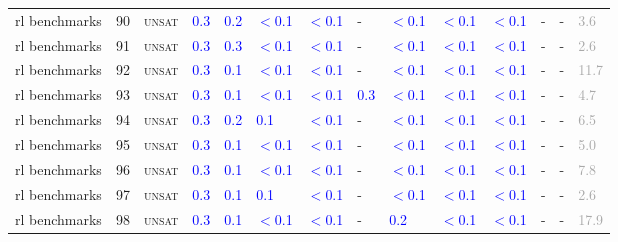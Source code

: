 \begin{center}
{\begin{longtable}{@{}llllllllllllll@{}}
rl benchmarks & 90 & \textsc{unsat} & \textcolor{blue}{0.3} & \textcolor{blue}{0.2} & \textcolor{blue}{$<$0.1} & \textcolor{blue}{$<$0.1} & - & \textcolor{blue}{$<$0.1} & \textcolor{blue}{$<$0.1} & \textcolor{blue}{$<$0.1} & - & - & \textcolor{darkgray}{3.6} \\
rl benchmarks & 91 & \textsc{unsat} & \textcolor{blue}{0.3} & \textcolor{blue}{0.3} & \textcolor{blue}{$<$0.1} & \textcolor{blue}{$<$0.1} & - & \textcolor{blue}{$<$0.1} & \textcolor{blue}{$<$0.1} & \textcolor{blue}{$<$0.1} & - & - & \textcolor{darkgray}{2.6} \\
rl benchmarks & 92 & \textsc{unsat} & \textcolor{blue}{0.3} & \textcolor{blue}{0.1} & \textcolor{blue}{$<$0.1} & \textcolor{blue}{$<$0.1} & - & \textcolor{blue}{$<$0.1} & \textcolor{blue}{$<$0.1} & \textcolor{blue}{$<$0.1} & - & - & \textcolor{darkgray}{11.7} \\
rl benchmarks & 93 & \textsc{unsat} & \textcolor{blue}{0.3} & \textcolor{blue}{0.1} & \textcolor{blue}{$<$0.1} & \textcolor{blue}{$<$0.1} & \textcolor{blue}{0.3} & \textcolor{blue}{$<$0.1} & \textcolor{blue}{$<$0.1} & \textcolor{blue}{$<$0.1} & - & - & \textcolor{darkgray}{4.7} \\
rl benchmarks & 94 & \textsc{unsat} & \textcolor{blue}{0.3} & \textcolor{blue}{0.2} & \textcolor{blue}{0.1} & \textcolor{blue}{$<$0.1} & - & \textcolor{blue}{$<$0.1} & \textcolor{blue}{$<$0.1} & \textcolor{blue}{$<$0.1} & - & - & \textcolor{darkgray}{6.5} \\
rl benchmarks & 95 & \textsc{unsat} & \textcolor{blue}{0.3} & \textcolor{blue}{0.1} & \textcolor{blue}{$<$0.1} & \textcolor{blue}{$<$0.1} & - & \textcolor{blue}{$<$0.1} & \textcolor{blue}{$<$0.1} & \textcolor{blue}{$<$0.1} & - & - & \textcolor{darkgray}{5.0} \\
rl benchmarks & 96 & \textsc{unsat} & \textcolor{blue}{0.3} & \textcolor{blue}{0.1} & \textcolor{blue}{$<$0.1} & \textcolor{blue}{$<$0.1} & - & \textcolor{blue}{$<$0.1} & \textcolor{blue}{$<$0.1} & \textcolor{blue}{$<$0.1} & - & - & \textcolor{darkgray}{7.8} \\
rl benchmarks & 97 & \textsc{unsat} & \textcolor{blue}{0.3} & \textcolor{blue}{0.1} & \textcolor{blue}{0.1} & \textcolor{blue}{$<$0.1} & - & \textcolor{blue}{$<$0.1} & \textcolor{blue}{$<$0.1} & \textcolor{blue}{$<$0.1} & - & - & \textcolor{darkgray}{2.6} \\
rl benchmarks & 98 & \textsc{unsat} & \textcolor{blue}{0.3} & \textcolor{blue}{0.1} & \textcolor{blue}{$<$0.1} & \textcolor{blue}{$<$0.1} & - & \textcolor{blue}{0.2} & \textcolor{blue}{$<$0.1} & \textcolor{blue}{$<$0.1} & - & - & \textcolor{darkgray}{17.9} \\

\end{longtable}}
\end{center}
